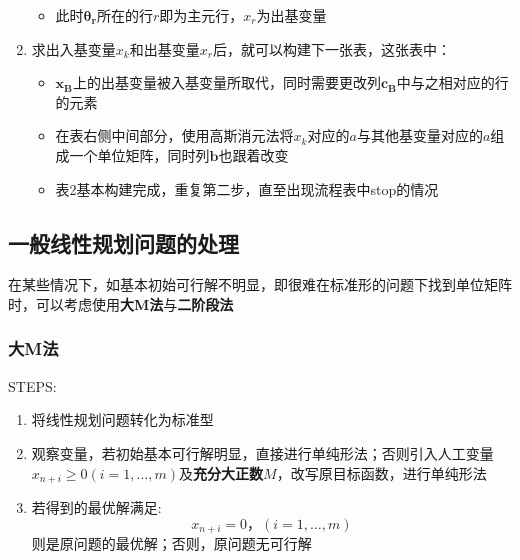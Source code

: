 \documentclass{book}
\begin{document}
\begin{enumerate}
\begin{itemize}
              \item 此时$\boldsymbol{\theta_r}$所在的行$r$即为主元行，$x_r$为出基变量
          \end{itemize}
    \item 求出入基变量$x_k$和出基变量$x_r$后，就可以构建下一张表，这张表中：
          \begin{itemize}
              \item $\boldsymbol{x_B}$上的出基变量被入基变量所取代，同时需要更改列$\boldsymbol{c_B}$中与之相对应的行的元素
              \item 在表右侧中间部分，使用高斯消元法将$x_k$对应的$a$与其他基变量对应的$a$组成一个单位矩阵，同时列$\boldsymbol{b}$也跟着改变
              \item 表2基本构建完成，重复第二步，直至出现流程表中stop的情况
          \end{itemize}
\end{enumerate}

\subsection{一般线性规划问题的处理}

在某些情况下，如基本初始可行解不明显，即很难在标准形的问题下找到单位矩阵时，可以考虑使用\textbf{大M法}与\textbf{二阶段法}

\subsubsection{大M法}
STEPS:
\begin{enumerate}
    \item 将线性规划问题转化为标准型
    \item 观察变量，若初始基本可行解明显，直接进行单纯形法；否则引入人工变量 $x_{n+i} \ge 0 (i = 1 , … ,m)$及\textbf{充分大正数}$M$，改写原目标函数，进行单纯形法
    \item 若得到的最优解满足: $$
              x_{n+i} = 0，(i = 1 , … , m)
          $$则是原问题的最优解；否则，原问题无可行解
\end{enumerate}
\end{document}
